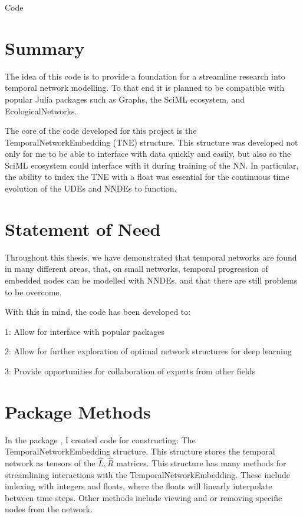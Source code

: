 \documentclass[12pt]{amsbook}
\begin{document}
\begin{chapter}{Code}
    \section{Summary}
        The idea of this code is to provide a foundation for a streamline research into temporal network modelling. To that end it is planned to be compatible with popular Julia packages such as Graphs, the SciML ecosystem, and EcologicalNetworks.

        The core of the code developed for this project is the TemporalNetworkEmbedding (TNE) structure. This structure was developed not only for me to be able to interface with data quickly and easily, but also so the SciML ecosystem could interface with it during training of the NN. In particular, the ability to index the TNE with a float was essential for the continuous time evolution of the UDEs and NNDEs to function.

    \section{Statement of Need}
        Throughout this thesis, we have demonstrated that temporal networks are found in many different areas, that, on small networks, temporal progression of embedded nodes can be modelled with NNDEs, and that there are still problems to be overcome. 

        With this in mind, the code has been developed to:

            1: Allow for interface with popular packages

            2: Allow for further exploration of optimal network structures for deep learning

            3: Provide opportunities for collaboration of experts from other fields

    \section{Package Methods}
        In the package \cite{DotProductGraphs}, I created code for constructing:
        The TemporalNetworkEmbedding structure. This structure stores the temporal network as tensors of the $\hat L, \hat R$ matrices. This structure has many methods for streamlining interactions with the TemporalNetworkEmbedding. These include indexing with integers and floats, where the floats will linearly interpolate between time steps. Other methods include viewing and or removing specific nodes from the network.
        

\end{chapter}
\end{document}
